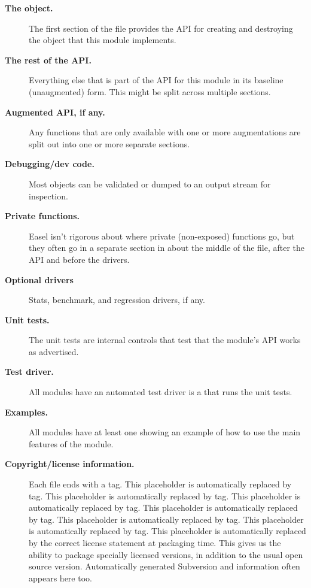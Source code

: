 \begin{description}
\item[\textbf{The  object.}]
  The first section of the file provides the API for creating and
  destroying the object that this module implements.

\item[\textbf{The rest of the API.}]
  Everything else that is part of the API for this module in its
  baseline (unaugmented) form. This might be split across multiple
  sections.

\item[\textbf{Augmented API, if any.}]
  Any functions that are only available with one or more augmentations
  are split out into one or more separate sections. 

\item[\textbf{Debugging/dev code.}]
  Most objects can be validated or dumped to an output stream
  for inspection.

\item[\textbf{Private functions.}]
  Easel isn't rigorous about where private (non-exposed) functions go,
  but they often go in a separate section in about the middle of the
   file, after the API and before the drivers.

\item[\textbf{Optional drivers}] Stats, benchmark, and regression
  drivers, if any. 

\item [\textbf{Unit tests.}]
  The unit tests are internal controls that test that the module's API
  works as advertised.

\item [\textbf{Test driver.}]
  All modules have an automated test driver is a  that
  runs the unit tests.
 
\item [\textbf{Examples.}]
  All modules have at least one  showing an example of
  how to use the main features of the module.

\item [\textbf{Copyright/license information.}]  Each file ends with a
   tag. This placeholder is automatically replaced by
   tag. This placeholder is automatically replaced by
   tag. This placeholder is automatically replaced by
   tag. This placeholder is automatically replaced by
  \ccode{} tag. This placeholder is automatically replaced by
   tag. This placeholder is automatically replaced by
   tag. This placeholder is automatically replaced by
  the correct license statement at packaging time. This gives us the
  ability to package specially licensed versions, in addition to the
  usual open source version. Automatically generated Subversion
   and  information often appears
  here too.


\end{description}
